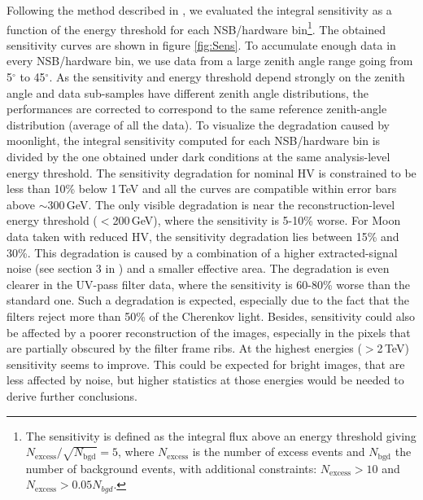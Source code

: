 \documentclass{PoS}
\begin{document}
Following the method described in \cite{upgrade2}, we evaluated the integral sensitivity as a function of the energy threshold for each NSB/hardware bin\footnote{The sensitivity is defined as the integral flux above an energy threshold giving $N_{\text{excess}} / \sqrt{N_{\text{bgd}}} = 5$, where $N_{\text{excess}}$ is the number of excess events and $N_{\text{bgd}}$ the number of background events, with additional constraints: $N_{\text{excess}} > 10$ and $N_{\text{excess}} > 0.05 N_{bgd}$.}. The obtained sensitivity curves are shown in figure \ref{fig:Sens}. To accumulate enough data in every NSB/hardware bin, we use data from a large zenith angle range going from 5$^\circ$ to 45$^\circ$. As the sensitivity and energy threshold depend strongly on the zenith angle and data sub-samples have different zenith angle distributions, the performances are corrected to correspond to the same reference zenith-angle distribution (average of all the data). To visualize the degradation caused by moonlight, the integral sensitivity computed for each NSB/hardware bin is divided by the one obtained under dark conditions at the same analysis-level energy threshold. %
The sensitivity degradation for nominal HV is constrained to be less than 10\% below 1\,TeV and all the curves are compatible within error bars above $\sim$300\,GeV. %
The only visible degradation is near the reconstruction-level energy threshold ($<$200\,GeV), where the sensitivity is 5-10\% worse. For Moon data taken with reduced HV, the sensitivity degradation lies between 15\% and 30\%.
This degradation is caused by a combination of a higher extracted-signal noise (see section 3 in \cite{MAGIC_moon}) and a smaller effective area. The degradation is even clearer in the UV-pass filter data, where the sensitivity is 60-80\% worse than the standard one. Such a degradation is expected, especially due to the fact that the filters reject more than 50\% of the Cherenkov light. Besides, sensitivity could also be affected by a poorer reconstruction of the images, especially in the pixels that are partially obscured by the filter frame ribs. At the highest energies ($>$2\,TeV) sensitivity seems to improve. This could be expected for bright images, that are less affected by noise, but higher statistics at those energies would be needed to
derive further conclusions.
\end{document}
